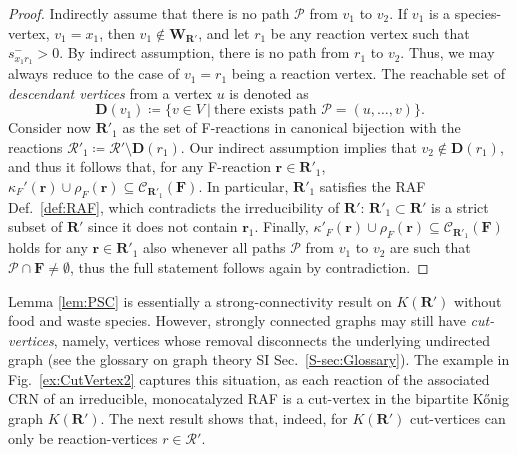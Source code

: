 \documentclass[pdflatex]{sn-jnl}
\theoremstyle{thmstyleone}%
\theoremstyle{examplesty}%
\theoremstyle{thmstylethree}%
\newcommand{\king}{K}
\newcommand{\food}{\ensuremath{\mathbf{F}}}
\newcommand{\closure}[2]{\mathscr{C}_{#1}(#2)}
\newcommand{\fr}[0]{\mathbf{r}}
\newcommand{\RAF}[0]{\mathbf{R}'}
\newcommand{\cat}{\kappa_F}
\begin{document}
\begin{proof}
  Indirectly assume that there is no path $\mathcal{P}$ from $v_1$ to
  $v_2$. If $v_1$ is a species-vertex, $v_1=x_1$, then
  $v_1\not\in\mathbf{W}_{\RAF}$, and let $r_1$ be any reaction vertex such
  that $s^-_{x_1r_1}>0$. By indirect assumption, there is no path from
  $r_1$ to $v_2$. Thus, we may always reduce to the case of $v_1=r_1$ being
  a reaction vertex. The reachable set of \emph{descendant vertices} from a
  vertex $u$ is denoted as
  \begin{equation}
    \mathbf{D}(v_1) \coloneqq \{v \in V \ \vert \
    \text{there exists path } \mathcal{P}=(u, \ldots, v)\}.
  \end{equation}
  Consider now $\RAF_1$ as the set of F-reactions in canonical bijection
  with the reactions
  $\mathcal{R}'_1\coloneqq \mathcal{R}' \setminus \mathbf{D}(r_1)$. Our
  indirect assumption implies that $v_2\not\in\mathbf{D}(r_1)$, and thus it
  follows that, for any F-reaction $\fr\in \RAF_1$,
  $\cat'(\fr)\cup \rho_F(\fr)\subseteq \closure{\RAF_1}{\food}$. In
  particular, $\RAF_1$ satisfies the RAF Def.~\ref{def:RAF}, which
  contradicts the irreducibility of $\RAF$: $\RAF_1\subset \RAF$ is a
  strict subset of $\RAF$ since it does not contain
  $\mathbf{r}_1$. Finally,
  $\kappa'_F(\fr)\cup \rho_F(\fr)\subseteq \closure{\RAF_1}{\food}$ holds
  for any $\fr\in \RAF_1$ also whenever all paths $\mathcal{P}$ from $v_1$
  to $v_2$ are such that $\mathcal{P}\cap \food \neq \emptyset$, thus the
  full statement follows again by contradiction.
\end{proof}

Lemma \ref{lem:PSC} is essentially a strong-connectivity result on
$K(\RAF)$ without food and waste species.  However, strongly connected
graphs may still have \emph{cut-vertices}, namely, vertices whose removal
disconnects the underlying undirected graph (see the glossary on graph
theory SI Sec.~\ref{S-sec:Glossary}). The example in
Fig.~\ref{ex:CutVertex2} captures this situation, as each reaction of the
associated CRN of an irreducible, monocatalyzed RAF is a cut-vertex in the
bipartite K\H{o}nig graph $\king(\RAF)$. The next result shows that,
indeed, for $\king(\RAF)$ cut-vertices can only be reaction-vertices
$r\in \mathcal{R}'$.
\end{document}
